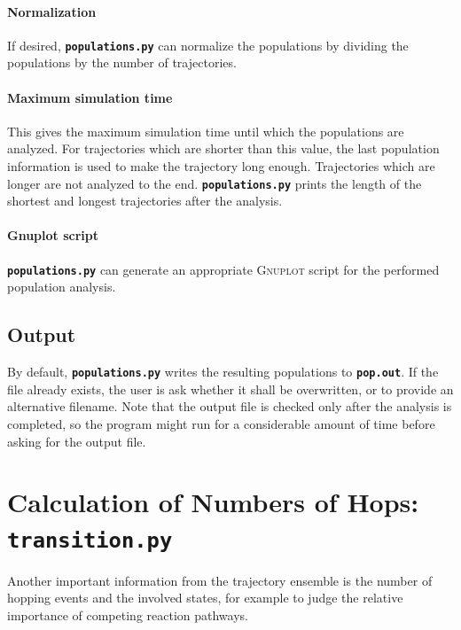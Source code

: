 \documentclass[a4paper,11pt,DIV=15,openany,twoside=false]{scrbook}
\newcommand{\ttt}[1]{\textbf{\texttt{#1}}}
\begin{document}
\paragraph{Normalization}

If desired, \ttt{populations.py} can normalize the populations by dividing the populations by the number of trajectories. 

\paragraph{Maximum simulation time}

This gives the maximum simulation time until which the populations are analyzed. For trajectories which are shorter than this value, the last population information is used to make the trajectory long enough. Trajectories which are longer are not analyzed to the end. \ttt{populations.py} prints the length of the shortest and longest trajectories after the analysis.

\paragraph{Gnuplot script}

\ttt{populations.py} can generate an appropriate \textsc{Gnuplot} script for the performed population analysis. 

\subsection{Output}

By default, \ttt{populations.py} writes the resulting populations to \ttt{pop.out}. If the file already exists, the user is ask whether it shall be overwritten, or to provide an alternative filename. Note that the output file is checked only after the analysis is completed, so the program might run for a considerable amount of time before asking for the output file.




\section{Calculation of Numbers of Hops: \ttt{transition.py}}\label{sec:transition.py}

Another important information from the trajectory ensemble is the number of hopping events and the involved states, for example to judge the relative importance of competing reaction pathways.
\end{document}
